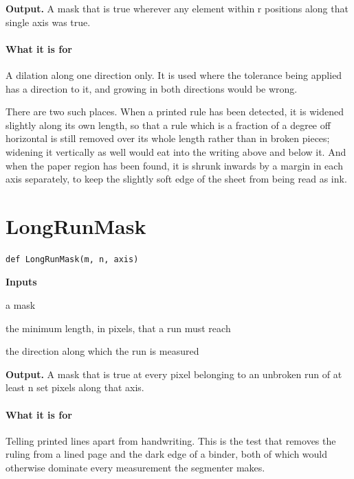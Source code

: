 \noindent\textbf{Output.} A mask that is true wherever any element within r positions along that single axis was true.


\paragraph{What it is for}
A dilation along one direction only. It is used where the tolerance being applied has a direction to it, and growing in both directions would be wrong.

There are two such places. When a printed rule has been detected, it is widened slightly along its own length, so that a rule which is a fraction of a degree off horizontal is still removed over its whole length rather than in broken pieces; widening it vertically as well would eat into the writing above and below it. And when the paper region has been found, it is shrunk inwards by a margin in each axis separately, to keep the slightly soft edge of the sheet from being read as ink.


\section{LongRunMask}
\begin{lstlisting}[style=sig]
def LongRunMask(m, n, axis)
\end{lstlisting}

\noindent\textbf{Inputs}
\begin{description}[leftmargin=2.2em,style=nextline,font=\normalfont\ttfamily]\setlength\itemsep{1pt}
  \item[{m}] \normalfont a mask
  \item[{n}] \normalfont the minimum length, in pixels, that a run must reach
  \item[{axis}] \normalfont the direction along which the run is measured
\end{description}

\noindent\textbf{Output.} A mask that is true at every pixel belonging to an unbroken run of at least n set pixels along that axis.


\paragraph{What it is for}
Telling printed lines apart from handwriting. This is the test that removes the ruling from a lined page and the dark edge of a binder, both of which would otherwise dominate every measurement the segmenter makes.


